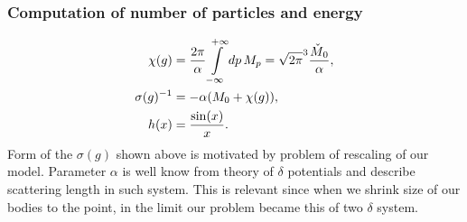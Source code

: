 \documentclass[10pt,t]{beamer}
\begin{document}
\begin{frame}
  \frametitle{Computation of number of particles and energy}

  \vspace{-2em}


  \begin{align}
    \chi( g )
    &=
      \frac{ 2 \pi }{ \alpha }
      \int\limits_{ -\infty }^{ +\infty } dp \, M_{ p } =
      \sqrt{ 2 \pi }^{ 3 } \frac{ \check{M}_{ \hspace{0.05em} 0 } }{ \alpha }, \\
    \sigma( g )^{ -1 }
    &=
      -\alpha ( M_{ 0 } + \chi( g ) ), \\
    h( x )
    &=
      \frac{ \sin( x ) }{ x }.
  \end{align}
  Form of the $\sigma( g )$ shown above is motivated by problem of rescaling
  of our model. Parameter $\alpha$ is well know from theory of $\delta$ potentials
  and describe scattering length in such system. This is relevant
  since when we shrink size of our bodies to the point, in the limit
  our problem became this of two $\delta$ system.





\end{frame}
\end{document}
